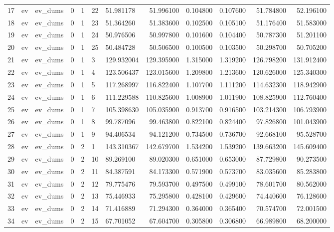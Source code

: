 \begin{tabular}{lllllllrrrrr}
17 & ev & ev_dums & 0 & 1 & 22 & 51.981178 & 51.996100 & 0.104800 & 0.107600 & 51.784800 & 52.196100 \\
18 & ev & ev_dums & 0 & 1 & 23 & 51.364260 & 51.383600 & 0.102500 & 0.105100 & 51.176400 & 51.583000 \\
19 & ev & ev_dums & 0 & 1 & 24 & 50.976506 & 50.997800 & 0.101600 & 0.104400 & 50.787300 & 51.201100 \\
20 & ev & ev_dums & 0 & 1 & 25 & 50.484728 & 50.506500 & 0.100500 & 0.103500 & 50.298700 & 50.705200 \\
21 & ev & ev_dums & 0 & 1 & 3 & 129.932004 & 129.395900 & 1.315000 & 1.319200 & 126.798200 & 131.912400 \\
22 & ev & ev_dums & 0 & 1 & 4 & 123.506437 & 123.015600 & 1.209800 & 1.213600 & 120.626000 & 125.340300 \\
23 & ev & ev_dums & 0 & 1 & 5 & 117.268997 & 116.822400 & 1.107700 & 1.111200 & 114.632300 & 118.942900 \\
24 & ev & ev_dums & 0 & 1 & 6 & 111.229588 & 110.825600 & 1.008900 & 1.011900 & 108.825900 & 112.760400 \\
25 & ev & ev_dums & 0 & 1 & 7 & 105.398630 & 105.035900 & 0.913700 & 0.916500 & 103.214300 & 106.793900 \\
26 & ev & ev_dums & 0 & 1 & 8 & 99.787096 & 99.463800 & 0.822100 & 0.824400 & 97.826800 & 101.043900 \\
27 & ev & ev_dums & 0 & 1 & 9 & 94.406534 & 94.121200 & 0.734500 & 0.736700 & 92.668100 & 95.528700 \\
28 & ev & ev_dums & 0 & 2 & 1 & 143.310367 & 142.679700 & 1.534200 & 1.539200 & 139.663200 & 145.609400 \\
29 & ev & ev_dums & 0 & 2 & 10 & 89.269100 & 89.020300 & 0.651000 & 0.653000 & 87.729800 & 90.273500 \\
30 & ev & ev_dums & 0 & 2 & 11 & 84.387591 & 84.173300 & 0.571900 & 0.573700 & 83.035600 & 85.283800 \\
31 & ev & ev_dums & 0 & 2 & 12 & 79.775476 & 79.593700 & 0.497500 & 0.499100 & 78.601700 & 80.562000 \\
32 & ev & ev_dums & 0 & 2 & 13 & 75.446933 & 75.295800 & 0.428100 & 0.429600 & 74.440600 & 76.128600 \\
33 & ev & ev_dums & 0 & 2 & 14 & 71.416889 & 71.294300 & 0.364000 & 0.365400 & 70.574700 & 72.001500 \\
34 & ev & ev_dums & 0 & 2 & 15 & 67.701052 & 67.604700 & 0.305800 & 0.306800 & 66.989800 & 68.200000 \\

\end{tabular}
